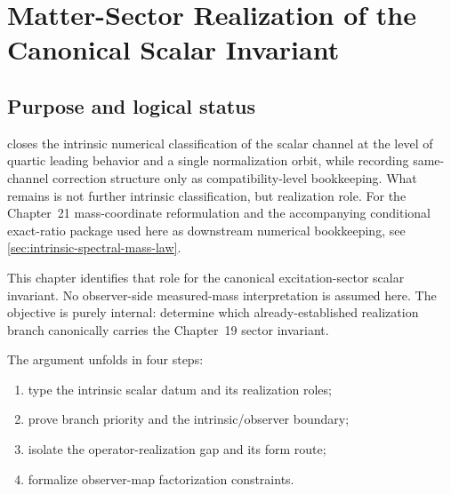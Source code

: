 \chapter{Matter-Sector Realization of the Canonical Scalar Invariant}
\label{ch:matter-realization}

\begin{chapterorientation}
\end{chapterorientation}
\section{Purpose and logical status}
\label{sec:matter-realization-purpose}

 closes the intrinsic numerical classification
of the scalar channel at the level of quartic leading behavior and a
single normalization orbit, while recording same-channel correction
structure only as compatibility-level bookkeeping.
What remains is not further intrinsic classification, but realization role.
For the Chapter~21 mass-coordinate reformulation and the accompanying
conditional exact-ratio package used here as downstream numerical
bookkeeping, see
\cref{sec:intrinsic-spectral-mass-law}.

This chapter identifies that role for the canonical excitation-sector scalar
invariant.
No observer-side measured-mass interpretation is assumed here.
The objective is purely internal: determine which already-established
realization branch canonically carries the Chapter~19 sector invariant.

The argument unfolds in four steps:
\begin{enumerate}[label=\textup{(\roman*)}]
\item type the intrinsic scalar datum and its realization roles;
\item prove branch priority and the intrinsic/observer boundary;
\item isolate the operator-realization gap and its form route;
\item formalize observer-map factorization constraints.
\end{enumerate}

